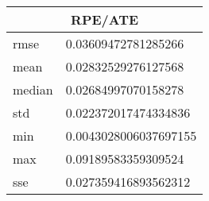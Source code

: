 \begin{table}[!ht] 
 \centering 
 \begin{tabular}{|l|l|} \hline 
 \multicolumn{2}{|c|}{RPE/ATE} \\ \hline 
 rmse & 0.03609472781285266 \\ \hline 
mean & 0.02832529276127568 \\ \hline 
median & 0.02684997070158278 \\ \hline 
std & 0.022372017474334836 \\ \hline 
min & 0.0043028006037697155 \\ \hline 
max & 0.09189583359309524 \\ \hline 
sse & 0.027359416893562312 \\ \hline 
\end{tabular} 
 \end{table}